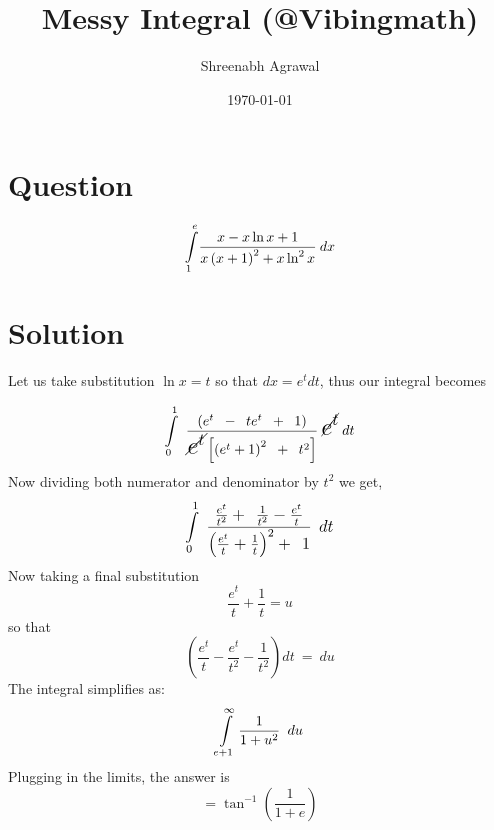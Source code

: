 \documentclass{article}
\title{Messy Integral (@Vibingmath)}
\author{Shreenabh Agrawal}
\date{\today}
\begin{document}
\maketitle

\section{Question}
$$\LARGE{{\int\limits_{1}^{e}}\frac{x-x\ln x+1}{x\left(x+1\right)^{2}+x\ln^{2}x}\: dx}$$
\section{Solution}

Let us take substitution $\ln x = t$ so that $dx = e^{t}dt$, thus our integral becomes

$$\LARGE{\int\limits_{0}^{1}}\ \frac{\left(e^{t}\ -\ te^{t}\ +\ 1\right)}{\cancel{e^{t}}\left[\left(e^{t}+1\right)^{2}\ +\ t^{2}\right]}\: {\cancel{e^{t}}}\:dt$$
Now dividing both numerator and denominator by $t^2$ we get, 
$$\mathlarger{\LARGE{\int\limits_{0}^{1}}\ \frac{\frac{e^{t}}{t^{2}}+\ \frac{1}{t^{2}}-\frac{e^{t}}{t}}{\left(\frac{e^{t}}{t}+\frac{1}{t}\right)^{2}+\ 1}\ dt}$$
Now taking a final substitution $$\frac{e^{t}}{t}+\frac{1}{t} = u$$ so that $$\left(\frac{e^{t}}{t}-\frac{e^{t}}{t^{2}}-\frac{1}{t^{2}}\right)dt\ =\ du$$
The integral simplifies as:
$$\LARGE{\int\limits_{e+1}^{\infty}\frac{1}{1+u^{2}}\ du}$$
Plugging in the limits, the answer is $$\boxed{=\tan^{-1}\left(\frac{1}{1+e}\right)}$$
\end{document}
